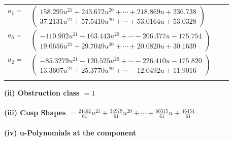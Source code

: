 \documentclass[1p]{elsarticle_modified}
\theoremstyle{definition}
\begin{document}
\begin{tabular}{m{7pt} m{180pt} m{7pt} m{180pt} }
\flushright $a_{1}=$&$\begin{pmatrix}158.295 u^{21}+243.672 u^{20}+\cdots+218.869 u+236.738\\37.2131 u^{21}+57.5410 u^{20}+\cdots+53.0164 u+53.0328\end{pmatrix}$ \\
\flushright $a_{6}=$&$\begin{pmatrix}-110.902 u^{21}-163.443 u^{20}+\cdots-206.377 u-175.754\\19.0656 u^{21}+29.7049 u^{20}+\cdots+20.0820 u+30.1639\end{pmatrix}$ \\
\flushright $a_{2}=$&$\begin{pmatrix}-85.3279 u^{21}-120.525 u^{20}+\cdots-226.410 u-175.820\\13.3607 u^{21}+25.3770 u^{20}+\cdots-12.0492 u+11.9016\end{pmatrix}$\\&\end{tabular}
\flushleft \textbf{(ii) Obstruction class $= 1$}\\~\\
\flushleft \textbf{(iii) Cusp Shapes $= \frac{24462}{61} u^{21}+\frac{34979}{61} u^{20}+\cdots+\frac{60315}{61} u+\frac{46454}{61}$}\\~\\
\newpage\renewcommand{\arraystretch}{1}
\flushleft \textbf{(iv) u-Polynomials at the component}\newline \\
\end{document}
